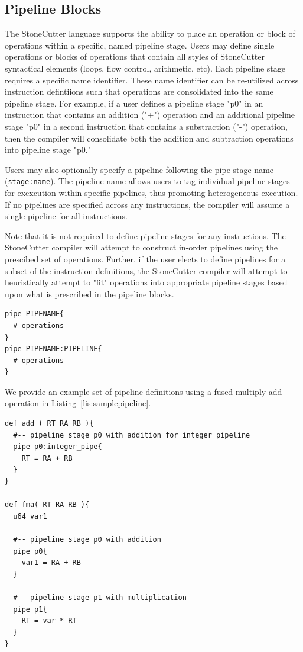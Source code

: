 \documentclass{article}
\begin{document}
\clearpage
\subsection{Pipeline Blocks}
\label{sec:PipelineBlocks}

The StoneCutter language supports the ability to place an operation or block of operations 
within a specific, named pipeline stage.  Users may define single operations or blocks of 
operations that contain all styles of StoneCutter syntactical elements (loops, flow control, arithmetic, etc).  
Each pipeline stage requires a specific name identifier.  These name identifier can be re-utilized across 
instruction defintiions such that operations are consolidated into the same pipeline stage.  For example, 
if a user defines a pipeline stage "p0" in an instruction that contains an addition ("+") 
operation and an additional pipeline stage "p0" in a second instruction that contains a 
substraction ("-") operation, then the compiler will consolidate both the addition and subtraction 
operations into pipeline stage "p0."

Users may also optionally specify a pipeline following the pipe stage name (\texttt{stage:name}).  
The pipeline name allows users to tag individual pipeline stages for exexcution within specific 
pipelines, thus promoting heterogeneous execution.  If no pipelines are specified across any 
instructions, the compiler will assume a single pipeline for all instructions.

Note that it is not required to define pipeline stages for any instructions.  The StoneCutter 
compiler will attempt to construct in-order pipelines using the prescibed set of operations.  Further, 
if the user elects to define pipelines for a subset of the instruction definitions, the 
StoneCutter compiler will attempt to heuristically attempt to "fit" operations 
into appropriate pipeline stages based upon what is prescribed in the pipeline blocks.

\vspace{0.125in}
\begin{lstlisting}[frame=single,style=base,caption={Pipeline Syntax},captionpos=b,label={lis:pipelinesyntax}]
pipe PIPENAME{
  # operations
}
pipe PIPENAME:PIPELINE{
  # operations
}
\end{lstlisting}

We provide an example set of pipeline definitions using a fused multiply-add operation in Listing~\ref{lis:samplepipeline}.

\vspace{0.125in}
\begin{lstlisting}[frame=single,style=base,caption={Sample Pipeline},captionpos=b,label={lis:samplepipeline}]
def add ( RT RA RB ){
  #-- pipeline stage p0 with addition for integer pipeline
  pipe p0:integer_pipe{
    RT = RA + RB
  }
}

def fma( RT RA RB ){
  u64 var1

  #-- pipeline stage p0 with addition
  pipe p0{
    var1 = RA + RB
  }

  #-- pipeline stage p1 with multiplication
  pipe p1{
    RT = var * RT
  }
}
\end{lstlisting}
\end{document}
